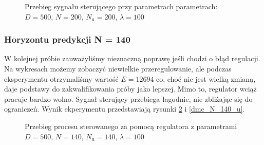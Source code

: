 \begin{figure}[b]
    \centering
    \caption{Przebieg sygnału sterującego przy parametrach parametrach: $D = 500$, $N = 200$, $N_{\mathrm{u}} = 200$, $\lambda = 100$}
    \label{dmc_N_200_u}
\end{figure}

\subsubsection{Horyzontu predykcji N = 140}
W kolejnej próbie zauważyliśmy nieznaczną poprawę jeśli chodzi o błąd regulacji. Na wykresach możemy zobaczyć niewielkie przeregulowanie, ale podczas eksperymentu otrzymaliśmy wartość $E = 12694$ co, choć nie jest wielką zmianą, daje podstawy do zakwalifikowania próby jako lepszej. Mimo to, regulator wciąż pracuje bardzo wolno. Sygnał sterujący przebiega łagodnie, nie zbliżając się do ograniczeń. Wynik ekperymentu przedstawiają rysunki \ref{dmc_N_140_y} i \ref{dmc_N_140_u}.

\begin{figure}[t]
    \centering
    \caption{Przebieg procesu sterowanego za pomocą regulatora z parametrami $D = 500$, $N = 140$, $N_{\mathrm{u}} = 140$, $\lambda = 100$}
    \label{dmc_N_140_y}
\end{figure}


